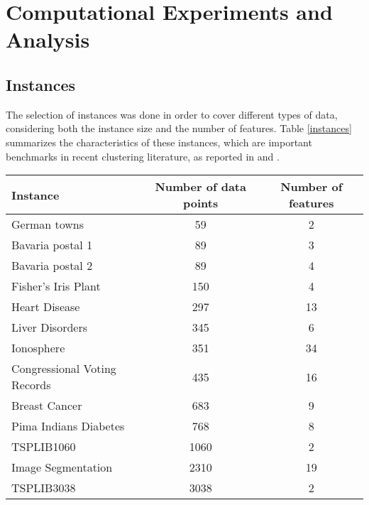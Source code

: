 \chapter{Computational Experiments and Analysis}

\section{Instances}
The selection of instances was done in order to cover different types of data, considering both the instance size and the number of features. Table \ref{instances} summarizes the characteristics of these instances, which are important benchmarks in recent clustering literature, as reported in \cite{Ordin2014} and \cite{Bagirov2016}.

\begin{table}[]
\centering
\begin{tabular}{@{}lcc@{}}
\toprule
Instance                        & Number of data points & Number of features \\ \midrule
German towns                    & 59                    & 2                  \\
Bavaria postal 1                & 89                    & 3                  \\
Bavaria postal 2                & 89                    & 4                  \\
Fisher’s Iris Plant             & 150                   & 4                  \\
Heart Disease                   & 297                   & 13                 \\
Liver Disorders                 & 345                   & 6                  \\
Ionosphere                      & 351                   & 34                 \\
Congressional Voting Records    & 435                   & 16                 \\
Breast Cancer                   & 683                   & 9                  \\
Pima Indians Diabetes           & 768                   & 8                  \\
TSPLIB1060                      & 1060                  & 2                  \\
Image Segmentation              & 2310                  & 19                 \\
TSPLIB3038                      & 3038                  & 2                  \\

\end{tabular}
\end{table}

